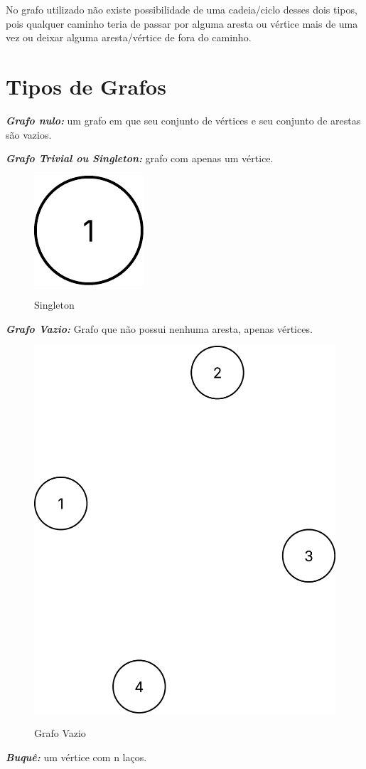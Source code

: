 No grafo utilizado não existe possibilidade de uma cadeia/ciclo desses dois tipos, pois qualquer caminho teria de passar por alguma aresta ou vértice mais de uma vez ou deixar alguma aresta/vértice de fora do caminho.


\section{Tipos de Grafos}\label{sec:tiposGrafos}
\textit{\textbf{Grafo nulo:}} um grafo em que seu conjunto de vértices e seu conjunto de arestas são vazios. \par
\textit{\textbf{Grafo Trivial ou Singleton:}} grafo com apenas um vértice.
\begin{figure} [H]
	\centering
	\caption{Singleton}%
	\label{fig:singleton}%
	\includegraphics[width=0.1\linewidth,angle=0]{figuras/tiposgrafos/singleton.png}%
	\\
\end{figure}
\par
\textit{\textbf{Grafo Vazio:}} Grafo que não possui nenhuma aresta, apenas vértices.
\begin{figure} [H]
	\centering
	\caption{Grafo Vazio}%
	\label{fig:grafVazio}%
	\includegraphics[width=0.5\linewidth,angle=0]{figuras/tiposgrafos/grafVazio.png}%
	\\
\end{figure}
\textit{\textbf{Buquê:}} um vértice com n laços.
